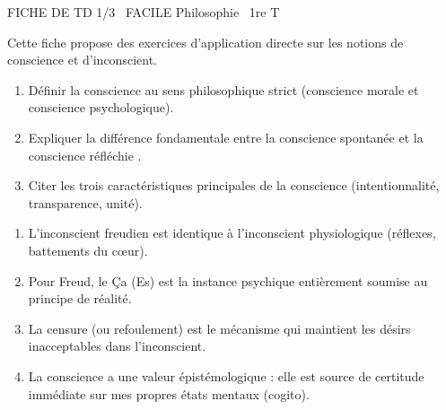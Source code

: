 \documentclass[11pt]{article}
\begin{document}
\begin{tcolorbox}[enhanced,colback=popink,colframe=popink,arc=10pt,boxrule=0pt,left=12pt,right=12pt,top=9pt,bottom=9pt]
{\color{white}\popxbold\small FICHE DE TD 1/3 \textbullet\ FACILE \hfill Philosophie \textbullet\ 1re T\par}
\end{tcolorbox}
\vspace{4pt}
Cette fiche propose des exercices d'application directe sur les notions de conscience et d'inconscient.

\begin{exercice}
\begin{enumerate}
    \item Définir la conscience au sens philosophique strict (conscience morale et conscience psychologique).
    \item Expliquer la différence fondamentale entre la conscience \og spontanée \fg{} et la conscience \og réfléchie \fg{}.
    \item Citer les trois caractéristiques principales de la conscience (intentionnalité, transparence, unité).
\end{enumerate}
\end{exercice}

\begin{exercice}
\begin{enumerate}
    \item L'inconscient freudien est identique à l'inconscient physiologique (réflexes, battements du cœur).
    \item Pour Freud, le \og Ça \fg{} (Es) est la instance psychique entièrement soumise au principe de réalité.
    \item La censure (ou refoulement) est le mécanisme qui maintient les désirs inacceptables dans l'inconscient.
    \item La conscience a une valeur épistémologique : elle est source de certitude immédiate sur mes propres états mentaux (cogito).
\end{enumerate}
\end{exercice}
\end{document}
